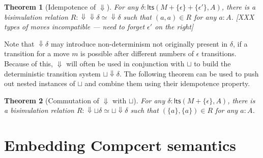 \documentclass[11pt]{article}
\newcommand{\kw}[1]{{\mathsf{#1}}}
\newtheorem{theorem}{Theorem}
\begin{document}
\begin{theorem}[Idempotence of $\Downarrow$]
\label{thm:bsidemp}
For any $\delta : \kw{lts}(M + \{\epsilon\} + \{\epsilon'\}, A)$,
there is a bisimulation relation
$R : {\Downarrow}{\Downarrow} \delta \simeq {\Downarrow}\delta$
such that $(a, a) \in R$ for any $a : A$.
[XXX types of moves incompatible ---
need to forget $\epsilon'$ on the right]
\end{theorem}

Note that ${\Downarrow} \delta$ may introduce non-determinism
not originally present in $\delta$,
if a transition for a move $m$ is possible
after different numbers of $\epsilon$ transitions.
Because of this,
$\Downarrow$ will often be used in conjunction with $\sqcup$
to build the deterministic transition system ${\sqcup}{\Downarrow}\delta$.
The following theorem can be used to push out
nested instances of $\sqcup$ and
combine them using their idempotence property.

\begin{theorem}[Commutation of $\Downarrow$ with $\sqcup$]
For any $\delta : \kw{lts}(M + \{\epsilon\}, A)$,
there is a bisimulation relation
$R : {\Downarrow}{\sqcup}\delta \simeq {\sqcup}{\Downarrow}\delta$
such that $(\{a\}, \{a\}) \in R$ for any $a : A$.
\end{theorem}







\section{Embedding Compcert semantics}
\label{sec:embed}
\end{document}
